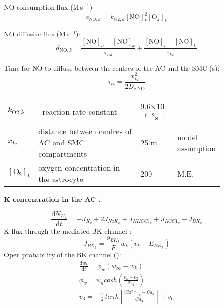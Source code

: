 \documentclass[fleqn]{report}
\numberwithin{equation}{section}
\numberwithin{equation}{section}
\newcommand{\NO}{\text{NO}}
\newcommand{\Otwo}{\text{O$_2$}}
\newcommand{\Ca}{\text{Ca$^{2+}$}}
\newcommand{\Cak}{\text{[Ca$^{2+}]_k$}}
\newcommand{\uMpers}{\textmu M\,s$^{-1}$}
\newcommand\e[1]{$\times$10$^{#1}$}
\newcommand{\n}{$^{-1}$}
\newcommand\cNO[1]{\text{$c_{\text{NO},#1}$}}
\newcommand\dNO[1]{\text{$d_{\text{NO},#1}$}}
\begin{document}
				NO consumption flux (\uMpers):
				\begin{equation} 
					\cNO{k} = k_{\text{O2},k} [\NO]_k^2 [\Otwo]_k
				\end{equation}
					
				NO diffusive flux (\uMpers):
				\begin{equation} 
					\dNO{k} = \frac{[\NO]_n - [\NO]_k}{\tau_{nk}} + \frac{[\NO]_i - [\NO]_k}{\tau_{ki}}
				\end{equation}	
					
				Time for NO to diffuse between the centres of the AC and the SMC (s):
				\begin{equation}
					\tau_{ki} = \frac{x_{ki}^2}{2 D_{\text{c,NO}}}
				\end{equation}
				
				\begin{table}[h!]
					\centering
					\begin{tabular}{ p{0.07\linewidth}  >{\footnotesize} p{0.47\linewidth}  >{\footnotesize} p{0.17\linewidth} >{\footnotesize} p{0.17\linewidth} }
						\hline
						$ k_{\text{O2},k} $ 	& \Otwo\ reaction rate constant							& 9.6\e{-6}\uM$^{-2}$s\n 	& \citep{Kavdia2002} \\ %
						$ x_{ki} $ 				& distance between centres of AC and SMC compartments 	& 25 \textmu m 				& model assumption \\ 
						$[\Otwo]_k$    & oxygen concentration in the astrocyte & 200 \uM 			& M.E. \\
						\hline
					\end{tabular}
				\end{table}
				
	\textbf{\gls{K} concentration in the AC  :}

	\begin{equation} \label{eq:KInt}
	\dfrac{\mathrm{d}N_{K_k}}{\mathrm{d}t}=- J_{K_k} + 2 J_{NaK_{k}} + J_{NKCC1_{k}} +  J_{KCC1_{k}}
	- J_{BK_k}  
	\end{equation}
	\gls{K} flux through the \Ca mediated BK channel  : 
	\begin{equation} \label{eq:J_BK}
	J_{BK_k}=\frac{g_{BK_k}}{F}w_k\left( v_k-E_{BK_k} \right)
	\end{equation}
		Open probability of the BK channel (\pers):
		\begin{eqnarray} \label{eq:dwkdt}
		\frac{\mathrm{d}w_{k}}{\mathrm{d}t} = \phi_{w} \left(w_{\infty}-w_{k} \right) \\
		\phi_{w}=\psi_{n}cosh(\frac{v_{k}-v_{3}}{2v_{4}}) \\
		v_{3}=-\frac{v_{5}}{2}tanh[\frac{\Cak-Ca_{3}}{Ca_{4}}]+v_{6}
		\end{eqnarray}
\end{document}
